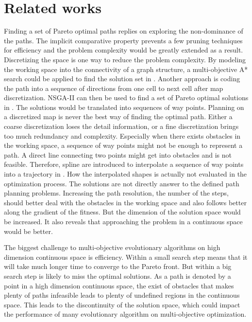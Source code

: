 \documentclass[conference]{IEEEtran}
\theoremstyle{definition}
\begin{document}
\section{Related works}
\label{sec:related_works}

Finding a set of Pareto optimal paths replies on exploring the non-dominance of the paths.
The implicit comparative property prevents a few pruning techniques for efficiency and the problem complexity would be greatly extended as a result.
Discretizing the space is one way to reduce the problem complexity.
By modeling the working space into the connectivity of a graph structure, a multi-objective A* search could be applied to find the solution set in \cite{Mandow:2005:NAM:1642293.1642328}.
Another approach is coding the path into a sequence of directions from one cell to next cell after map discretization.
NSGA-II can then be used to find a set of Pareto optimal solutions in \cite{Ahmed2013}.
The solutions would be translated into sequences of way points.
Planning on a discretized map is never the best way of finding the optimal path.
Either a coarse discretization loses the detail information, or a fine discretization brings too much redundancy and complexity.
Especially when there exists obstacles in the working space, a sequence of way points might not be enough to represent a path.
A direct line connecting two points might get into obstacles and is not feasible.  
Therefore, spline are introduced to interpolate a sequence of way points into a trajectory in \cite{6181426}.
How the interpolated shapes is actually not evaluated in the optimization process. 
The solutions are not directly answer to the defined path planning problems.
Increasing the path resolution, the number of the steps, should better deal with the obstacles in the working space and also follows better along the gradient of the fitness.
But the dimension of the solution space would be increased.
It also reveals that approaching the problem in a continuous space would be better.

The biggest challenge to multi-objective evolutionary algorithms on high dimension continuous space is efficiency.
Within a small search step means that it will take much longer time to converge to the Pareto front.
But within a big search step is likely to miss the optimal solutions.
As a path is denoted by a point in a high dimension continuous space, the exist of obstacles that makes plenty of paths infeasible leads to plenty of undefined regions in the continuous space.
This leads to the discontinuity of the solution space, which could impact the performance of many evolutionary algorithm on multi-objective optimization.
\end{document}
